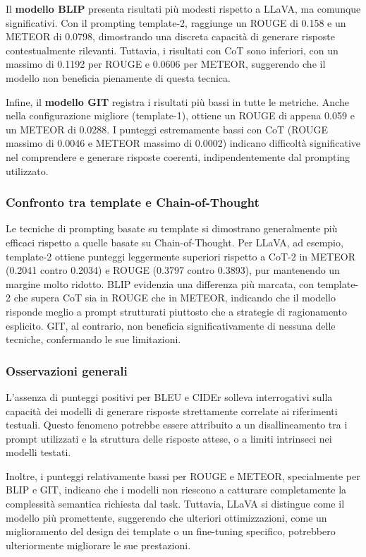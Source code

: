 \documentclass[../main.tex]{subfiles}
\begin{document}
Il \textbf{modello BLIP} presenta risultati più modesti rispetto a LLaVA, ma comunque significativi. Con il prompting template-2, raggiunge un ROUGE di 0.158 e un METEOR di 0.0798, dimostrando una discreta capacità di generare risposte contestualmente rilevanti. Tuttavia, i risultati con CoT sono inferiori, con un massimo di 0.1192 per ROUGE e 0.0606 per METEOR, suggerendo che il modello non beneficia pienamente di questa tecnica.

Infine, il \textbf{modello GIT} registra i risultati più bassi in tutte le metriche. Anche nella configurazione migliore (template-1), ottiene un ROUGE di appena 0.059 e un METEOR di 0.0288. I punteggi estremamente bassi con CoT (ROUGE massimo di 0.0046 e METEOR massimo di 0.0002) indicano difficoltà significative nel comprendere e generare risposte coerenti, indipendentemente dal prompting utilizzato.

\subsubsection{Confronto tra template e Chain-of-Thought}

Le tecniche di prompting basate su template si dimostrano generalmente più efficaci rispetto a quelle basate su Chain-of-Thought. Per LLaVA, ad esempio, template-2 ottiene punteggi leggermente superiori rispetto a CoT-2 in METEOR (0.2041 contro 0.2034) e ROUGE (0.3797 contro 0.3893), pur mantenendo un margine molto ridotto. BLIP evidenzia una differenza più marcata, con template-2 che supera CoT sia in ROUGE che in METEOR, indicando che il modello risponde meglio a prompt strutturati piuttosto che a strategie di ragionamento esplicito. GIT, al contrario, non beneficia significativamente di nessuna delle tecniche, confermando le sue limitazioni.

\subsubsection{Osservazioni generali}

L'assenza di punteggi positivi per BLEU e CIDEr solleva interrogativi sulla capacità dei modelli di generare risposte strettamente correlate ai riferimenti testuali. Questo fenomeno potrebbe essere attribuito a un disallineamento tra i prompt utilizzati e la struttura delle risposte attese, o a limiti intrinseci nei modelli testati. 

Inoltre, i punteggi relativamente bassi per ROUGE e METEOR, specialmente per BLIP e GIT, indicano che i modelli non riescono a catturare completamente la complessità semantica richiesta dal task. Tuttavia, LLaVA si distingue come il modello più promettente, suggerendo che ulteriori ottimizzazioni, come un miglioramento del design dei template o un fine-tuning specifico, potrebbero ulteriormente migliorare le sue prestazioni.
\end{document}
